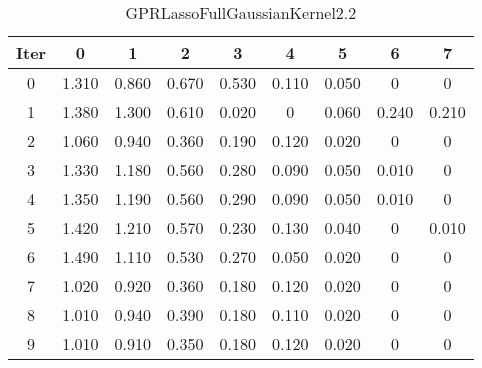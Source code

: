 \begin{table}
	\begin{center}
		\begin{tabular}{|c|c|c|c|c|c|c|c|c|}
			\hline
			Iter & 0 & 1 & 2 & 3 & 4 & 5 & 6 & 7 \\
			\hline
			0 & 1.310 & 0.860 & 0.670 & 0.530 & 0.110 & 0.050 & 0 & 0 \\
			\hline
			1 & 1.380 & 1.300 & 0.610 & 0.020 & 0 & 0.060 & 0.240 & 0.210 \\
			\hline
			2 & 1.060 & 0.940 & 0.360 & 0.190 & 0.120 & 0.020 & 0 & 0 \\
			\hline
			3 & 1.330 & 1.180 & 0.560 & 0.280 & 0.090 & 0.050 & 0.010 & 0 \\
			\hline
			4 & 1.350 & 1.190 & 0.560 & 0.290 & 0.090 & 0.050 & 0.010 & 0 \\
			\hline
			5 & 1.420 & 1.210 & 0.570 & 0.230 & 0.130 & 0.040 & 0 & 0.010 \\
			\hline
			6 & 1.490 & 1.110 & 0.530 & 0.270 & 0.050 & 0.020 & 0 & 0 \\
			\hline
			7 & 1.020 & 0.920 & 0.360 & 0.180 & 0.120 & 0.020 & 0 & 0 \\
			\hline
			8 & 1.010 & 0.940 & 0.390 & 0.180 & 0.110 & 0.020 & 0 & 0 \\
			\hline
			9 & 1.010 & 0.910 & 0.350 & 0.180 & 0.120 & 0.020 & 0 & 0 \\
			\hline
		\end{tabular}
	\end{center}
	\caption{GPRLassoFullGaussianKernel2.2}
\end{table}